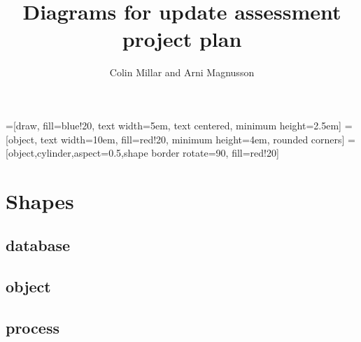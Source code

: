 \documentclass{article}
\begin{document}
\title{Diagrams for update assessment project plan}
\author{Colin Millar and Arni Magnusson}
\maketitle



=[draw, fill=blue!20, text width=5em, text centered, minimum height=2.5em]
 = [object, text width=10em, fill=red!20,  minimum height=4em, rounded corners]
 = [object,cylinder,aspect=0.5,shape border rotate=90, fill=red!20]






  \section{Shapes}

\subsection{database}


\subsection{object}


\subsection{process}

\end{document}
